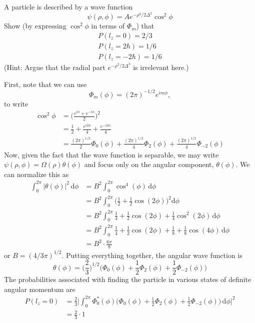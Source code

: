 \documentclass[../principles-of-quantum-mechanics.tex]{subfiles}
\begin{document}
\begin{questions}
	\question A particle is described by a wave function
	$$\psi(\rho, \phi) = Ae^{-\rho^2/2\Delta^2}\cos^2\phi$$
	Show (by expressing $\cos^2\phi$ in terms of $\Phi_m$) that
	\begin{gather*}
		P(l_z = 0) = 2/3 \\
		P(l_z = 2\hbar) = 1/6 \\
		P(l_z = -2\hbar) = 1/6
	\end{gather*}
	(Hint: Argue that the radial part $e^{-\rho^2/2\Delta^2}$ is irrelevant here.)
	\begin{solution}
		First, note that we can use
		$$\Phi_m(\phi) = (2\pi)^{-1/2}e^{im\phi},$$
		to write
		\begin{align*}
			\cos^2\phi &= \Big(\frac{e^{i\phi} + e^{-i\phi}}{2}\Big)^2 \\
			&= \frac{1}{2} + \frac{e^{i2\phi}}{4} + \frac{e^{-i2\phi}}{4} \\
			&= \frac{(2\pi)^{1/2}}{2}\Phi_0(\phi) + \frac{(2\pi)^{1/2}}{4}\Phi_2(\phi) + \frac{(2\pi)^{1/2}}{4}\Phi_{-2}(\phi)
		\end{align*}
		Now, given the fact that the wave function is separable, we may write $\psi(\rho, \phi) = \Omega(\rho)\theta(\phi)$ and focus only on the angular component, $\theta(\phi)$. We can normalize this as
		\begin{align*}
			\int_0^{2\pi}|\theta(\phi)|^2\,\mathrm{d}\phi &= B^2\int_0^{2\pi}\cos^4(\phi)\,\mathrm{d}\phi \\
			&= B^2\int_0^{2\pi}\Big(\frac{1}{2} + \frac{1}{2}\cos(2\phi)\Big)^2\mathrm{d}\phi \\
			&= B^2\int_0^{2\pi}\frac{1}{4} + \frac{1}{2}\cos(2\phi) + \frac{1}{4}\cos^2(2\phi)\,\mathrm{d}\phi \\
			&= B^2\int_0^{2\pi}\frac{1}{4} + \frac{1}{2}\cos(2\phi) + \frac{1}{8} + \frac{1}{8}\cos(4\phi)\,\mathrm{d}\phi \\
			&= B^2\cdot\frac{6\pi}{8}
		\end{align*}
		or $B = (4/3\pi)^{1/2}$. Putting everything together, the angular wave function is
		$$\theta(\phi) = \Big(\frac{2}{3}\Big)^{1/2}\Big(\Phi_0(\phi) + \frac{1}{2}\Phi_2(\phi) + \frac{1}{2}\Phi_{-2}(\phi)\Big)$$
		The probabilities associated with finding the particle in various states of definite angular momentum are
		\begin{align*}
			P(l_z = 0) &= \frac{2}{3}\Big|\int_0^{2\pi}\Phi_0^*(\phi)\Big(\Phi_0(\phi) + \frac{1}{2}\Phi_2(\phi) + \frac{1}{2}\Phi_{-2}(\phi)\Big)\,\mathrm{d}\phi\Big|^2 \\
			&= \frac{2}{3}\cdot 1 \\

\end{align*}
\end{solution}
\end{questions}
\end{document}
